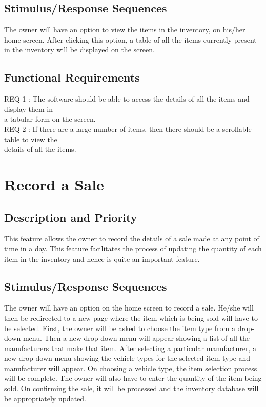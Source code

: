 \documentclass{scrreprt}
\begin{document}
\subsection{Stimulus/Response Sequences}

The owner will have an option to view the items in the inventory, on his/her home screen. After clicking this option, a table of all the items currently present in the inventory will be displayed on the screen.

\subsection{Functional Requirements}

REQ-1 : The software should be able to access the details of all the items and display them in\\\hspace*{1.5cm} a tabular form on the screen.\\
REQ-2 : If there are a large number of items, then there should be a scrollable table to view the\\ \hspace*{1.5cm} details of all the items.

\section{Record a Sale}
\label{sec:4.3}

\subsection{Description and Priority}

This feature allows the owner to record the details of a sale made at any point of time in a day. This feature facilitates the process of updating the quantity of each item in the inventory and hence is quite an important feature.

\subsection{Stimulus/Response Sequences}

The owner will have an option on the home screen to record a sale. He/she will then be redirected to a new page where the item which is being sold will have to be selected. First, the owner will be asked to choose the item type from a drop-down menu. Then a new drop-down menu will appear showing a list of all the manufacturers that make that item. After selecting a particular manufacturer, a new drop-down menu showing the vehicle types for the selected item type and manufacturer will appear. On choosing a vehicle type, the item selection process will be complete. The owner will also have to enter the quantity of the item being sold. On confirming the sale, it will be processed and the inventory database will be appropriately updated.
\end{document}
